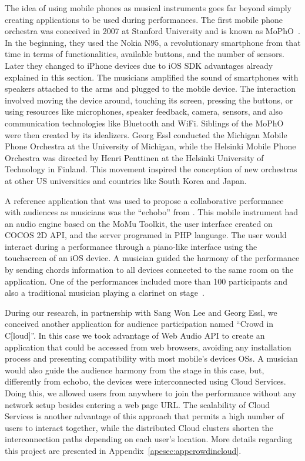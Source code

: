 The idea of using mobile phones as musical instruments goes far beyond simply creating applications to be used during performances.
The first mobile phone orchestra was conceived in 2007 at Stanford University and is known as MoPhO~\citep{Wang2008domobilephones}.
In the beginning, they used the Nokia N95, a revolutionary smartphone from that time in terms of functionalities, available buttons, and the number of sensors.
Later they changed to iPhone devices due to iOS SDK advantages already explained in this section.
The musicians amplified the sound of smartphones with speakers attached to the arms and plugged to the mobile device.
The interaction involved moving the device around, touching its screen, pressing the buttons, or using resources like microphones, speaker feedback, camera, sensors, and also communication technologies like Bluetooth and WiFi.
Siblings of the MoPhO were then created by its idealizers.
Georg Essl conducted the Michigan Mobile Phone Orchestra at the University of Michigan, while the Helsinki Mobile Phone Orchestra was directed by Henri Penttinen at the Helsinki University of Technology in Finland.
This movement inspired the conception of new orchestras at other US universities and countries like South Korea and Japan.

A reference application that was used to propose a collaborative performance with audiences as musicians was the ``echobo'' from \citeauthor{Lee2013echobo}.
This mobile instrument had an audio engine based on the MoMu Toolkit, the user interface created on COCOS 2D API, and the server programed in PHP language. 
The user would interact during a performance through a piano-like interface using the touchscreen of an iOS device.
A musician guided the harmony of the performance by sending chords information to all devices connected to the same room on the application.
One of the performances included more than 100 participants and also a traditional musician playing a clarinet on stage~\citep{Lee2013echobo}.

During our research, in partnership with Sang Won Lee and Georg Essl, we conceived another application for audience participation named ``Crowd in C[loud]''.
In this case we took advantage of Web Audio API to create an application that could be accessed from web browsers, avoiding any installation process and presenting compatibility with most mobile's devices OSs.
A musician would also guide the audience harmony from the stage in this case, but, differently from echobo, the devices were interconnected using Cloud Services.
Doing this, we allowed users from anywhere to join the performance without any network setup besides entering a web page URL.
The scalability of Cloud Services is another advantage of this approach that permits a high number of users to interact together, while the distributed Cloud clusters shorten the interconnection paths depending on each user's location.
More details regarding this project are presented in Appendix~\ref{apesec:appcrowdincloud}.

